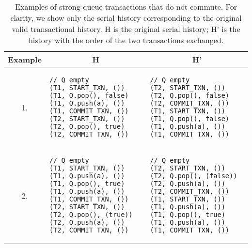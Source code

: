 \begin{table}[t]
    \singlespace
    \centering
    \begin{tabular}{|c|l|l|}
        \hline
        Example & \multicolumn{1}{c}{H} & \multicolumn{1}{|c|}{H'} \\
        \hline
        1. & 
\begin{lstlisting}
// Q empty
(T1, START_TXN, ())                       
(T1, Q.pop(), false)                       
(T1, Q.push(a), ())                       
(T1, COMMIT_TXN, ())                       
(T2, START_TXN, ())                       
(T2, Q.pop(), true)                       
(T2, COMMIT_TXN, ())                       
\end{lstlisting} &
\begin{lstlisting}
// Q empty
(T2, START_TXN, ())                       
(T2, Q.pop(), false)                       
(T2, COMMIT_TXN, ())                       
(T1, START_TXN, ())                       
(T1, Q.pop(), false)                       
(T1, Q.push(a), ())                       
(T1, COMMIT_TXN, ())                       
\end{lstlisting}\\
\hline
    2. &
\begin{lstlisting}
// Q empty
(T1, START_TXN, ())                       
(T1, Q.push(a), ())                       
(T1, Q.pop(), true)                       
(T1, Q.push(a), ())                       
(T1, COMMIT_TXN, ())                       
(T2, START_TXN, ())                       
(T2, Q.pop(), (true))                       
(T2, Q.push(a), ())                       
(T2, COMMIT_TXN, ())                       
\end{lstlisting} &
\begin{lstlisting}
// Q empty
(T2, START_TXN, ())                       
(T2, Q.pop(), (false))                       
(T2, Q.push(a), ())                       
(T2, COMMIT_TXN, ())                       
(T1, START_TXN, ())                       
(T1, Q.push(a), ())                       
(T1, Q.pop(), true)                       
(T1, Q.push(a), ())                       
(T1, COMMIT_TXN, ())                       
\end{lstlisting}\\
    \hline
    
    \end{tabular}
    \caption[Examples of strong queue transactions that do not commute]{Examples of strong queue transactions that do not commute. For clarity, we show only the serial history corresponding to the original valid transactional history.
    H is the original serial history; H' is the history with the order of the two transactions exchanged.}
    \label{tab:txnal_strongq_commute}
    \end{table}

